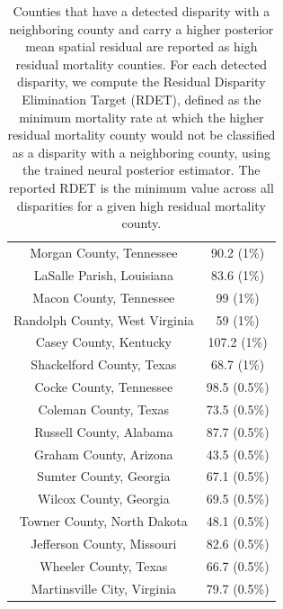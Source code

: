 \begin{table}[ht]
\begin{tabular}{cc}
  Morgan County, Tennessee & 90.2 (1\%) \\ 
  LaSalle Parish, Louisiana & 83.6 (1\%) \\ 
  Macon County, Tennessee & 99 (1\%) \\ 
  Randolph County, West Virginia & 59 (1\%) \\ 
  Casey County, Kentucky & 107.2 (1\%) \\ 
  Shackelford County, Texas & 68.7 (1\%) \\ 
  Cocke County, Tennessee & 98.5 (0.5\%) \\ 
  Coleman County, Texas & 73.5 (0.5\%) \\ 
  Russell County, Alabama & 87.7 (0.5\%) \\ 
  Graham County, Arizona & 43.5 (0.5\%) \\ 
  Sumter County, Georgia & 67.1 (0.5\%) \\ 
  Wilcox County, Georgia & 69.5 (0.5\%) \\ 
  Towner County, North Dakota & 48.1 (0.5\%) \\ 
  Jefferson County, Missouri & 82.6 (0.5\%) \\ 
  Wheeler County, Texas & 66.7 (0.5\%) \\ 
  Martinsville City, Virginia & 79.7 (0.5\%) \\ 
   \bottomrule
\end{tabular}
\caption{Counties that have a detected disparity with a neighboring county and carry a higher posterior mean spatial residual are reported as high residual mortality counties. For each detected disparity, we compute the Residual Disparity Elimination Target (RDET), defined as the minimum mortality rate at which the higher residual mortality county would not be classified as a disparity with a neighboring county, using the trained neural posterior estimator. The reported RDET is the minimum value across all disparities for a given high residual mortality county.} 
\label{tab:min_RDETs}
\end{table}
